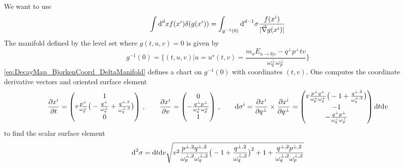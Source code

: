 We want to use
\begin{equation}
    \int\text{d}^dx f(x^i)\delta(g(x^i))=\int_{g^{-1}(0)}\text{d}^{d-1}\sigma\frac{f(x^i)}{{\vert\vec{\nabla}g(x^i)\vert}}
\end{equation}
The manifold defined by the level set where $g(t,u,v)=0$ is given by 
\begin{equation}
    g^{-1}(0)=\Bigg\{(t,u,v)\Big\vert u=u^\star(t,v)=\frac{m_aE_{a\rightarrow b\vert c}-q^\perp p^\perp tv}{\omega_q^\perp\omega_p^\perp}\Bigg\}
    \label{eq:DecayMap_BjorkenCoord_DeltaManifold}
\end{equation}
\eqref{eq:DecayMap_BjorkenCoord_DeltaManifold} defines a chart on $g^{-1}(0)$ with coordinates $(t,v)$. One computes the coordinate derivative vectors and oriented surface element
\begin{equation}
    \frac{\partial x^i}{\partial t}=\begin{pmatrix}
    1\\
    v\frac{p^\perp}{\omega_p^\perp}\big(-\frac{q^\perp}{\omega_q^\perp}+\frac{q^{\perp,3}}{\omega_q^{\perp,3}}\big)\\
    0
    \end{pmatrix}\,,\qquad
    \frac{\partial x^i}{\partial v}=\begin{pmatrix}
        0\\
        -\frac{q^\perp p^\perp}{\omega_q^\perp\omega_p^\perp}\\
        1
    \end{pmatrix}\,,\qquad
    \text{d}\sigma^i=\frac{\partial x^i}{\partial q^\perp}\times \frac{\partial x^i}{\partial q^\perp}=\begin{pmatrix}
        v\frac{p^\perp q^\perp}{\omega_p^\perp\omega_q^\perp}\big(-1+\frac{q^{\perp,2}}{\omega_q^{\perp,2}}\big)\\
        -1\\
        -\frac{q^\perp p^\perp}{\omega_q^\perp\omega_p^\perp}
    \end{pmatrix}\text{d} t\text{d} v
\end{equation}
to find the scalar surface element
\begin{equation}
    \text{d}^2\sigma=\text{d} t\text{d} v\sqrt{v^2\frac{p^{\perp,2}q^{\perp,2}}{\omega_p^{\perp,2}\omega_q^{\perp,2}}\big(-1+\frac{q^{\perp,2}}{\omega_q^{\perp,2}}\big)^2+1+\frac{q^{\perp,2} p^{\perp,2}}{\omega_q^{\perp,2}\omega_p^{\perp,2}}}
\end{equation}